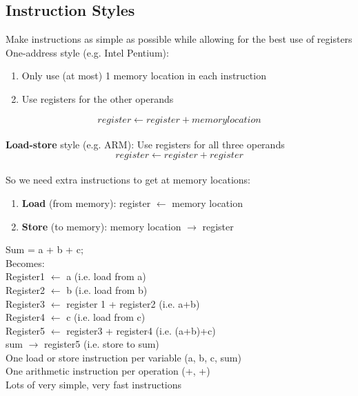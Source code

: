 \documentclass{article}
\begin{document}
\subsection{Instruction Styles}
Make instructions as simple as possible while allowing for the best use of registers\\
One-address style (e.g. Intel Pentium):
\begin{enumerate}
\item Only use (at most) 1 memory location in each instruction
\item Use registers for the other operands
\end{enumerate}
\[register \leftarrow register + memory location\]\\
\textbf{Load-store} style (e.g. ARM): Use registers for all three operands\\
\[register \leftarrow register + register\]\\
So we need extra instructions to get at memory locations:
\begin{enumerate}
\item \textbf{Load} (from memory): register \(\leftarrow\) memory location
\item \textbf{Store} (to memory): memory location \(\rightarrow\) register
\end{enumerate}
Sum = a + b + c;\\
Becomes:\\
Register1 \(\leftarrow\) a                      (i.e. load from a)\\
Register2 \(\leftarrow\) b                      (i.e. load from b)\\
Register3 \(\leftarrow\) register 1 + register2 (i.e. a+b)\\
Register4 \(\leftarrow\) c                      (i.e. load from c)\\
Register5 \(\leftarrow\) register3 + register4  (i.e. (a+b)+c)\\
sum \(\rightarrow\) register5                   (i.e. store to sum)\\
One load or store instruction per variable (a, b, c, sum)\\
One arithmetic instruction per operation (+, +)\\
Lots of very simple, very fast instructions
\end{document}
